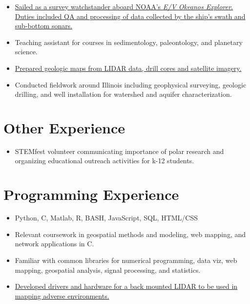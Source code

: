 \documentclass{cv_TOH}
\begin{document}
\begin{itemize}
\item \href{http://www.niutoday.info/2014/04/17/niu-student-lands-coveted-internship-aboard-exploration-ship/}{Sailed as a survey watchstander aboard NOAA's \textit{E/V Okeanos Explorer}. Duties included QA and processing of data collected by the ship's swath and sub-bottom sonars.}
\end{itemize}

\begin{itemize}
\item Teaching assistant for courses in sedimentology, paleontology, and planetary science.
\end{itemize}

\begin{itemize}
\item \href{http://www.isgs.illinois.edu/sites/isgs/files/maps/isgs-quads/aurora-south-sg.pdf}{Prepared geologic maps from LIDAR data, drill cores and satellite imagery.}
\item Conducted fieldwork around Illinois including geophysical surveying, geologic drilling, and well installation for watershed and aquifer characterization. 
\end{itemize}

\section{Other Experience}
\begin{itemize}
\item STEMfest volunteer communicating importance of polar research and organizing educational outreach activities for k-12 students.
\end{itemize}

\section{Programming Experience}
\begin{itemize}
\item Python, C, Matlab, R, BASH, JavaScript, SQL, HTML/CSS
\item Relevant coursework in geospatial methods and modeling, web mapping, and network applications in C.
\item Familiar with common libraries for numerical programming, data viz, web mapping, geospatial analysis, signal processing, and statistics.
\item \href{https://github.com/tohodson/velodyne_tools}{Developed drivers and hardware for a back mounted LIDAR to be used in mapping adverse environments.}
\end{itemize}
\end{document}
